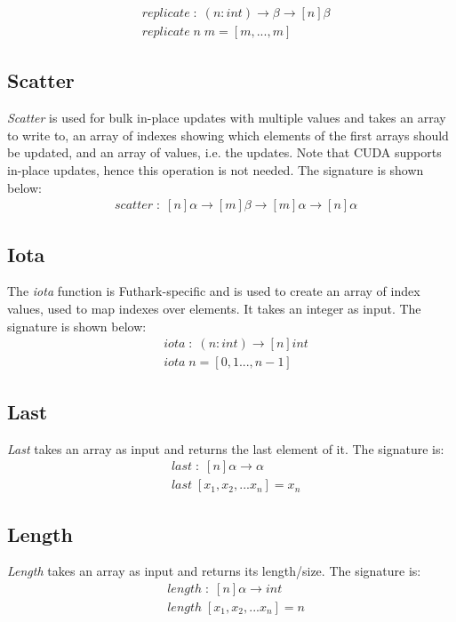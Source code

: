 \begin{align}
  \nonumber&\mathit{replicate}\;:\;(n:int)\rightarrow\beta\rightarrow [n] \beta\\
  \nonumber&\mathit{replicate}\;n\;m=[m,...,m]
\end{align}

\subsection{Scatter}
\textit{Scatter} is used for bulk in-place updates with multiple values and takes an array to write to, an array of indexes showing which elements of the first arrays should be updated, and an array of values, i.e. the updates. Note that CUDA supports in-place updates, hence this operation is not needed. The signature is shown below:
\begin{align}
  \nonumber&\mathit{scatter}\;:\;[n]\alpha\rightarrow[m]\beta\rightarrow [m]\alpha\rightarrow [n]\alpha
\end{align}

\subsection{Iota}
The \textit{iota} function is Futhark-specific and is used to create an array of index values, used to map indexes over elements. It takes an integer as input. The signature is shown below:
\begin{align}
  \nonumber&\mathit{iota}\;:\;(n:int)\rightarrow[n]\mathit{int}\\
  \nonumber&\mathit{iota}\;n=[0,1...,n-1]
\end{align}
\subsection{Last}
\textit{Last} takes an array as input and returns the last element of it. The signature is:
\begin{align}
  \nonumber&\mathit{last}\;:\;[n]\alpha\rightarrow\alpha\\
  \nonumber&\mathit{last}\;[x_1, x_2, ... x_n]=x_n
\end{align}
\subsection{Length}
\textit{Length} takes an array as input and returns its length/size. The signature is:
\begin{align}
  \nonumber&\mathit{length}\;:\;[n]\alpha\rightarrow int\\
  \nonumber&\mathit{length}\;[x_1, x_2, ... x_n]=n
\end{align}

